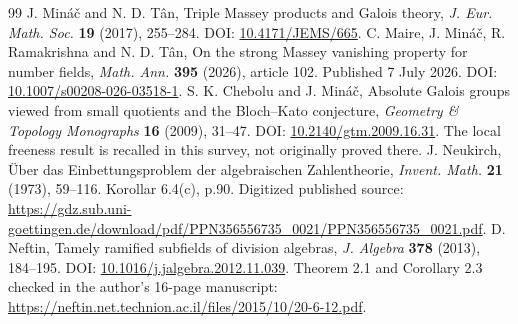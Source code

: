 \begin{thebibliography}{99}
 J. Min\'{a}\v{c} and N. D. T\^{a}n, Triple Massey products and Galois theory, \emph{J. Eur. Math. Soc.} \textbf{19} (2017), 255--284. DOI: \href{https://doi.org/10.4171/JEMS/665}{10.4171/JEMS/665}.
 C. Maire, J. Min\'{a}\v{c}, R. Ramakrishna and N. D. T\^{a}n, On the strong Massey vanishing property for number fields, \emph{Math. Ann.} \textbf{395} (2026), article 102. Published 7 July 2026. DOI: \href{https://doi.org/10.1007/s00208-026-03518-1}{10.1007/s00208-026-03518-1}.
 S. K. Chebolu and J. Min\'{a}\v{c}, Absolute Galois groups viewed from small quotients and the Bloch--Kato conjecture, \emph{Geometry \& Topology Monographs} \textbf{16} (2009), 31--47. DOI: \href{https://doi.org/10.2140/gtm.2009.16.31}{10.2140/gtm.2009.16.31}. The local freeness result is recalled in this survey, not originally proved there.
 J. Neukirch, \"{U}ber das Einbettungsproblem der algebraischen Zahlentheorie, \emph{Invent. Math.} \textbf{21} (1973), 59--116. Korollar 6.4(c), p.90. Digitized published source: \url{https://gdz.sub.uni-goettingen.de/download/pdf/PPN356556735_0021/PPN356556735_0021.pdf}.
 D. Neftin, Tamely ramified subfields of division algebras, \emph{J. Algebra} \textbf{378} (2013), 184--195. DOI: \href{https://doi.org/10.1016/j.jalgebra.2012.11.039}{10.1016/j.jalgebra.2012.11.039}. Theorem 2.1 and Corollary 2.3 checked in the author's 16-page manuscript: \url{https://neftin.net.technion.ac.il/files/2015/10/20-6-12.pdf}.
\end{thebibliography}
